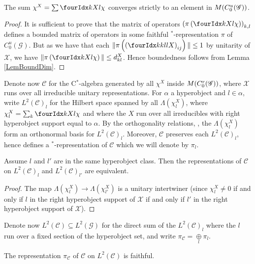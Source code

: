    
\begin{Lem} The sum $\chi^X  =\sum \Gr{\chi}{}{X}{k}{l}$ converges strictly to an element in $M(C^{u}_{0}(\mathscr{G}))$. 
\end{Lem} 
 
\begin{proof} It is sufficient to prove that the matrix of operators $\left(\pi\left(\Gr{\chi}{}{X}{k}{l}\right)\right)_{k,l}$ defines a bounded matrix of operators in some faithful $^*$-representation $\pi$ of $C^{u}_{0}(\mathscr{G})$. But as we have that each $\|\pi\left(\left(\Gr{X}{k}{l}{k}{l}\right)_{ij}\right)\|\leq 1$ by unitarity of $\mathscr{X}$, we have $\| \pi\left(\Gr{\chi}{}{X}{k}{l}\right)\| \leq d^X_{kl}$.  Hence boundedness follows from Lemma \ref{LemBoundDim}.
\end{proof} 
 
Denote now $\mathcal{C}$ for the C$^*$-algebra generated by all $\chi^X$ inside $M(C^{r}_{0}(\mathscr{G}))$, where $\mathscr{X}$ runs over all irreducible unitary representations. For $\alpha$ a hyperobject and $l\in \alpha$, write  $L^2(\mathcal{C})_l$ for the Hilbert space spanned by all $\Lambda(\chi^X_l)$, where $\chi^X_l = \sum_{k} \Gr{\chi}{}{X}{k}{l}$ and where the $X$ run over all irreducibles with right hyperobject support equal to $\alpha$. By the orthogonality relations, \cite[Corollary 2.23]{DCT1}, the $\Lambda(\chi^X_l)$ form an orthonormal basis for $L^2(\mathcal{C})_l$. Moreover, $\mathcal{C}$ preserves each $L^2(\mathcal{C})_l$, hence defines a $^*$-representation of $\mathcal{C}$ which we will denote by $\pi_l$. 

\begin{Lem}\label{LemEq} Assume $l$ and $l'$ are in the same hyperobject class. Then the representations of $\mathcal{C}$ on $L^2(\mathcal{C})_l$ and $L^2(\mathcal{C})_{l'}$ are equivalent.
\end{Lem} 
\begin{proof} The map $\Lambda(\chi^X_l)\rightarrow \Lambda(\chi^X_{l'})$ is a unitary intertwiner (since $\chi^X_l\neq 0$ if and only if $l$ in the right hyperobject support of $\mathscr{X}$ if and only if $l'$ in the right hyperobject support of $\mathscr{X}$).
\end{proof} 

Denote now $L^2(\mathcal{C})\subseteq L^2(\mathscr{G})$ for the direct sum of the $L^2(\mathcal{C})_l$ where the $l$ run over a fixed section of the hyperobject set, and write $\pi_{\mathcal{C}}= \underset{l}{\oplus} \pi_l$. 
 
\begin{Prop} The representation $\pi_{\mathcal{C}}$ of $\mathcal{C}$ on $L^2(\mathcal{C})$ is faithful.
\end{Prop} 

